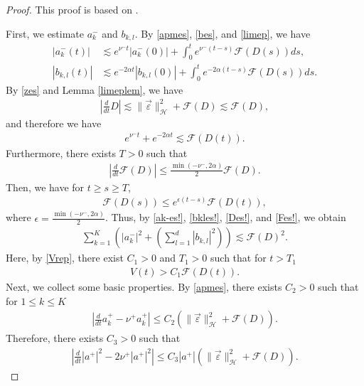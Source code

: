 \documentclass[reqno]{amsart}
\theoremstyle{plain}
\theoremstyle{definition}
\numberwithin{equation}{section}
\newcommand{\1}{\mathbbm{1}}
\begin{document}
\begin{proof}
This proof is based on \cite[subsection 6.2]{IN}.

First, we estimate $a_k^-$ and $b_{k,l}$. By \eqref{apmes}, \eqref{bes}, and \eqref{limep}, we have
\begin{align}
|a_k^-(t)|&\lesssim e^{\nu^-t}|a_k^-(0)|+\int_0^te^{\nu^-(t-s)}\mathcal{F}(D(s))ds,\label{ak-es!}
\\
|b_{k,l}(t)|&\lesssim e^{-2\alpha t}|b_{k,l}(0)|+\int_0^t e^{-2\alpha(t-s)}\mathcal{F}(D(s))ds.\label{bkles!}
\end{align}
By \eqref{zes} and Lemma \ref{limeplem}, we have
\begin{align*}
\left|\frac{d}{dt}D\right|\lesssim \|\vec{\varepsilon}\|_{\mathcal{H}}^2+\mathcal{F}(D)\lesssim \mathcal{F}(D),
\end{align*}
and therefore we have
\begin{align}
e^{\nu^-t}+e^{-2\alpha t}\lesssim \mathcal{F}(D(t)).\label{Des!}
\end{align}
Furthermore, there exists $T>0$ such that 
\begin{align*}
\left| \frac{d}{dt}\mathcal{F}(D)\right|\leq \frac{\min{(-\nu^-,2\alpha)}}{2} \mathcal{F}(D).
\end{align*}
Then, we have for $t\geq s\geq T$,
\begin{align}
\mathcal{F}(D(s))\leq e^{\epsilon(t-s)}\mathcal{F}(D(t)),\label{Fes!}
\end{align}
where $\epsilon=\frac{\min{(-\nu^-,2\alpha)}}{2}$. Thus, by \eqref{ak-es!}, \eqref{bkles!}, \eqref{Des!}, and \eqref{Fes!}, we obtain
\begin{align}\label{a+nozokisim}
\sum_{k=1}^K \left(|a_k^-|^2+\left(\sum_{l=1}^d |b_{k,l}|^2\right)\right)\lesssim \mathcal{F}(D)^2.
\end{align}
Here, by \eqref{Vrep}, there exist $C_1>0$ and $T_1>0$ such that for $t>T_1$
\begin{align}\label{Vrepes1}
V(t)>C_1\mathcal{F}(D(t)).
\end{align}
Next, we collect some basic properties. By \eqref{apmes}, there exists $C_2>0$ such that for $1\leq k\leq K$ 
\begin{align*}
\left|\frac{d}{dt}a_k^+-\nu^+a_k^+\right|\leq C_2(\|\vec{\varepsilon}\|_{\mathcal{H}}^2+\mathcal{F}(D)).
\end{align*}
Therefore, there exists $C_3>0$ such that
\begin{align}\label{a+lemass}
\left| \frac{d}{dt}|a^+|^2-2\nu^+|a^+|^2 \right|\leq C_3|a^+|(\|\vec{\varepsilon}\|_{\mathcal{H}}^2+\mathcal{F}(D)).  

\end{align}
\end{proof}
\end{document}
